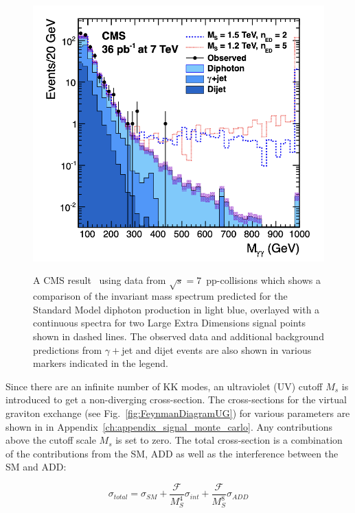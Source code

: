 \begin{figure}[!htbp]
    \centering
     \caption{A CMS result~\cite{CMS:2011uvc} using data from $\sqrt{s} = 7$~\TeV pp-collisions which shows a comparison of the invariant mass spectrum predicted for the Standard Model diphoton production in light blue, overlayed with a continuous spectra for two Large Extra Dimensions signal points shown in dashed lines. The observed data and additional background predictions from $\gamma+$jet and dijet events are also shown in various markers indicated in the legend.}
    \includegraphics[scale=0.6]{fig/InvariantMass.png}
    \label{fig:CMSModelDiphotonInvMass}
\end{figure}


Since there are an infinite number of KK modes, an ultraviolet (UV) cutoff $M_s$ is introduced to get a non-diverging cross-section. The cross-sections for the virtual graviton exchange (see Fig.~\ref{fig:FeynmanDiagramUG}) for various parameters are shown in in Appendix~\ref{ch:appendix_signal_monte_carlo}. Any contributions above the cutoff scale $M_s$ is set to zero. The total cross-section is a combination of the contributions from the SM, ADD as well as the interference between the SM and ADD:

\begin{equation}
\sigma_{total} = \sigma_{SM} + \frac{\mathcal{F}}{M^4_{S}} \sigma_{int}+\frac{\mathcal{F}}{M^8_{S}} \sigma_{ADD} 
\label{eq:totalADDxsec}
\end{equation}


